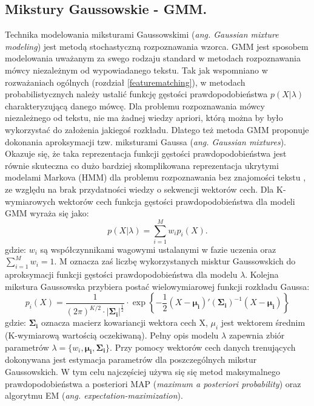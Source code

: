 \subsection{Mikstury Gaussowskie - GMM.}
Technika modelowania miksturami Gaussowskimi (\textit{ang. Gaussian mixture modeling}) jest metodą stochastyczną rozpoznawania wzorca. GMM jest sposobem modelowania uważanym za swego rodzaju standard w metodach rozpoznawania mówcy niezależnym od wypowiadanego tekstu. Tak jak wspomniano w rozważaniach ogólnych (rozdział \ref{featurematching}), w metodach probabilistycznych należy ustalić funkcję gęstości prawdopodobieństwa $p(X|\lambda)$ charakteryzującą danego mówcę. Dla problemu rozpoznawania mówcy niezależnego od tekstu, nie ma żadnej wiedzy apriori, którą można by było wykorzystać do założenia jakiegoś rozkładu. Dlatego też metoda GMM proponuje dokonania aproksymacji tzw. miksturami Gaussa (\textit{ang. Gaussian mixtures}). Okazuje się, że taka reprezentacja funkcji gęstości prawdopodobieństwa jest równie skuteczna co dużo bardziej skomplikowana reprezentacja ukrytymi modelami Markova (HMM) dla problemu rozpoznawania bez znajomości tekstu \cite{reynolds}, ze względu na brak przydatności wiedzy o sekwencji wektorów cech. Dla K-wymiarowych wektorów cech funkcja gęstości prawdopodobieństwa dla modeli GMM wyraża się jako:
\begin{equation}
  p(X|\lambda) = \sum^{M}_{i=1} w_ip_i(X).
\end{equation}
gdzie: $w_i$ są współczynnikami wagowymi ustalanymi w fazie uczenia oraz $\sum_{i=1}^{M} w_i =1$. M oznacza zaś liczbę wykorzystanych misktur Gaussowskich do aproksymacji funkcji gęstości prawdopodobieństwa dla modelu $ \lambda$. Kolejna mikstura Gaussowska przybiera postać wielowymiarowej funkcji rozkładu Gaussa:
\begin{equation}
  p_i(X)=\frac{1}{(2\pi)^{K/2} \cdot |\bm{\Sigma_i}|^{\frac{1}{2}}} \cdot \exp\left\{-\frac{1}{2}(X- \bm{\mu_i})'(\bm{\Sigma_i})^{-1}(X-\bm{\mu_i})\right\}
\end{equation}
gdzie: $\bm{\Sigma_i}$ oznacza macierz kowariancji wektora cech X, $\mu_i$ jest wektorem średnim (K-wymiarową wartością oczekiwaną). Pełny opis modelu $\lambda$ zapewnia zbiór parametrów $\lambda = \{w_i,\bm{\mu_i},\bm{\Sigma_i} \}$. Przy pomocy wektorów cech danych trenujących dokonywana jest estymacja parametrów dla poszczególnych mikstur Gaussowskich. W tym celu najczęściej używa się się metod maksymalnego prawdopodobieństwa a posteriori MAP (\textit{maximum a posteriori probability}) oraz algorytmu EM (\textit{ang. expectation-maximization}).
